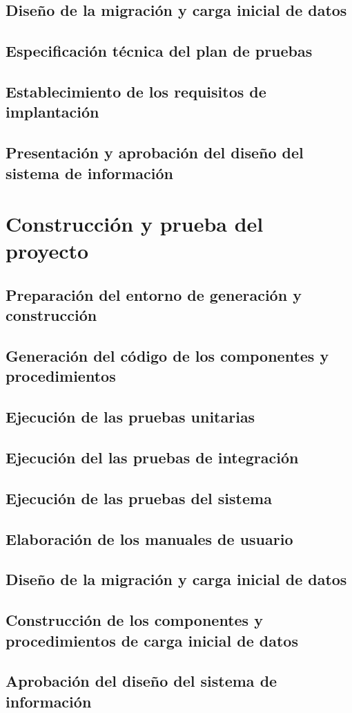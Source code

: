 \documentclass[11pt,a4paper,spanish,twoside]{report}
\begin{document}
\subsection{Diseño de la migración y carga inicial de datos}
\subsection{Especificación técnica del plan de pruebas}
\subsection{Establecimiento de los requisitos de implantación}
\subsection{Presentación y aprobación del diseño del sistema de información}
\section{Construcción y prueba del proyecto}
\subsection{Preparación del entorno de generación y construcción}
\subsection{Generación del código de los componentes y procedimientos}
\subsection{Ejecución de las pruebas unitarias}
\subsection{Ejecución del las pruebas de integración}
\subsection{Ejecución de las pruebas del sistema}
\subsection{Elaboración de los manuales de usuario}
\subsection{Diseño de la migración y carga inicial de datos}
\subsection{Construcción de los componentes y procedimientos de carga inicial 
de datos}
\subsection{Aprobación del diseño del sistema de información}

 

\end{document}
